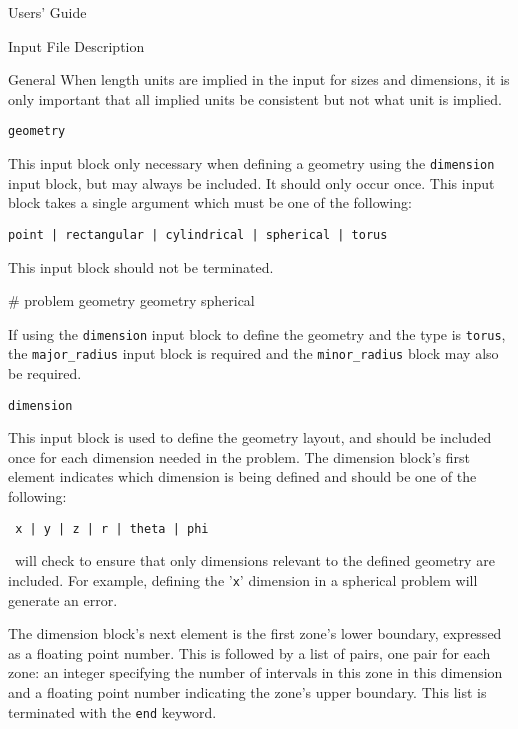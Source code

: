 \begin{chapter}{Users' Guide\label{app:user.guide}}
\begin{section}{Input File Description\label{app:user.input}}
\begin{subsection}{General}
      When length units are implied in the input for sizes and
      dimensions, it is only important that all implied units be
      consistent but not what unit is implied.
    \end{subsection}
    
    \begin{subsection}{\texttt{geometry}\label{app:user.input.geom}}
    
      This input block only necessary when defining a geometry using
      the \texttt{dimension} input block, but may always be included.
      It should only occur once.  This input block takes a single
      argument which must be one of the following:
      \begin{center}
        \texttt{point | rectangular | cylindrical | spherical | torus}
      \end{center}
      This input block should not be terminated.

      \begin{center}
        \renewcommand{\baselinestretch}{1}\normalsize
        \begin{boxedverbatim}
# problem geometry
geometry spherical          
\end{boxedverbatim}
      \end{center}

      If using the \texttt{dimension} input block to define the
      geometry and the type is \texttt{torus}, the
      \texttt{major\_radius} input block is required and the
      \texttt{minor\_radius} block may also be required.
    \end{subsection}

    \begin{subsection}{\texttt{dimension}\label{app:user.input.dim}}
      
      This input block is used to define the geometry layout, and
      should be included once for each dimension needed in the
      problem.  The dimension block's first element indicates which
      dimension is being defined and should be one of the following:
      \begin{center}
        \texttt{ x | y | z | r | theta | phi }
      \end{center}
      \ALARA\ will check to ensure that only dimensions relevant to
      the defined geometry are included.  For example, defining the
      '\texttt{x}' dimension in a spherical problem will generate an
      error.
      
      The dimension block's next element is the first zone's lower
      boundary, expressed as a floating point number.  This is
      followed by a list of pairs, one pair for each zone: an integer
      specifying the number of intervals in this zone in this
      dimension and a floating point number indicating the zone's
      upper boundary. This list is terminated with the \texttt{end}
      keyword.
      

\end{subsection}
\end{section}
\end{chapter}
